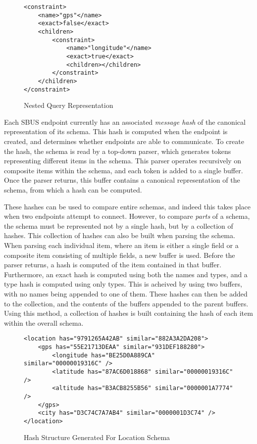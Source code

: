 \documentclass[12pt,twoside,notitlepage]{report}
\begin{document}
\begin{figure}
\begin{lstlisting}[style=xml]
<constraint>
	<name>"gps"</name>
	<exact>false</exact>
	<children>
		<constraint>
			<name>"longitude"</name>
			<exact>true</exact>
			<children></children>
		</constraint>
	</children>
</constraint>
\end{lstlisting}
\caption{Nested Query Representation}
\label{fig:nested_query}
\end{figure} 

Each SBUS endpoint currently has an associated {\sl message hash} of the canonical representation of its schema. 
This hash is computed when the endpoint is created, and determines whether endpoints are able to communicate. 
To create the hash, the schema is read by a top-down parser, which generates tokens representing different items in the schema. 
This parser operates recursively on composite items within the schema, and each token is added to a single buffer. 
Once the parser returns, this buffer contains a canonical representation of the schema, from which a hash can be computed. 

These hashes can be used to compare entire schemas, and indeed this takes place when two endpoints attempt to connect. 
However, to compare {\sl parts} of a schema, the schema must be represented not by a single hash, but by a collection of hashes. 
This collection of hashes can also be built when parsing the schema. 
When parsing each individual item, where an item is either a single field or a composite item consisting of multiple fields, a new buffer is used. 
Before the parser returns, a hash is computed of the item contained in that buffer. 
Furthermore, an exact hash is computed using both the names and types, and a type hash is computed using only types. 
This is acheived by using two buffers, with no names being appended to one of them. 
These hashes can then be added to the collection, and the contents of the buffers appended to the parent buffers. 
Using this method, a collection of hashes is built containing the hash of each item within the overall schema. 

\begin{figure}
\begin{lstlisting}[style=xml]
<location has="9791265A42AB" similar="882A3A2DA208">
	<gps has="55E21713DEAA" similar="931DEF188280">
		<longitude has="BE25D0A889CA" similar="00000019316C" />
		<latitude has="87AC6D018868" similar="00000019316C" />
		<altitude has="B3ACB8255B56" similar="0000001A7774" />
	</gps>
	<city has="D3C74C7A7AB4" similar="0000001D3C74" />
</location>
\end{lstlisting}
\caption{Hash Structure Generated For Location Schema}
\label{fig:locationhashes}
\end{figure}
\end{document}
